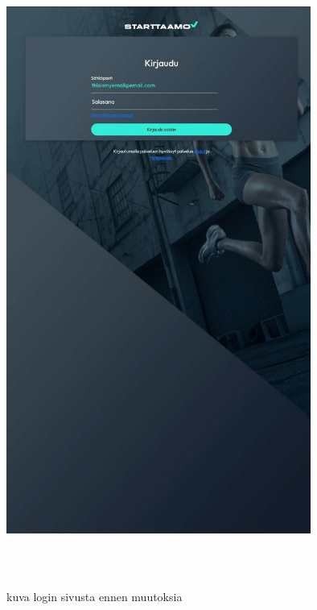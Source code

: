 \includegraphics[width=10cm, height=20cm]{src/public/loginnormal.jpg} \\
\medskip

kuva login sivusta ennen muutoksia
\medskip

